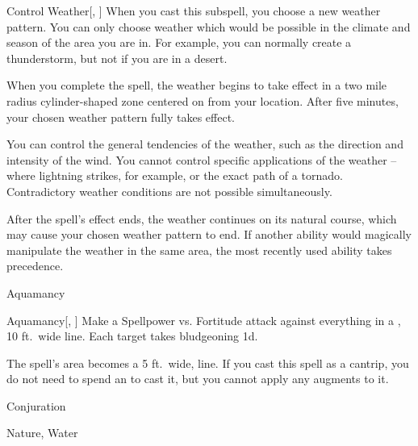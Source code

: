 \begin{ability}[\nth{7}]{Control Weather}[, ]
When you cast this subspell, you choose a new weather pattern.
You can only choose weather which would be possible in the climate and season of the area you are in.
For example, you can normally create a thunderstorm, but not if you are in a desert.

When you complete the spell, the weather begins to take effect in a two mile radius cylinder-shaped zone centered on from your location.
After five minutes, your chosen weather pattern fully takes effect.

You can control the general tendencies of the weather, such as the direction and intensity of the wind.
You cannot control specific applications of the weather -- where lightning strikes, for example, or the exact path of a tornado.
Contradictory weather conditions are not possible simultaneously.

After the spell's effect ends, the weather continues on its natural course, which may cause your chosen weather pattern to end.
If another ability would magically manipulate the weather in the same area, the most recently used ability takes precedence.
\end{ability}
\vspace{0.25em}

\newpage
\begin{spellsection}{Aquamancy}

\begin{spellheader}
\end{spellheader}


\begin{ability}{Aquamancy}[, ]
Make a Spellpower vs. Fortitude attack against everything in a \arealarge, 10 ft.\ wide line.
\hit Each target takes bludgeoning  \minus1d.
\end{ability}



 The spell's area becomes a 5 ft.\ wide, \areamed line. If you cast this spell as a cantrip,
you do not need to spend an  to cast it,
but you cannot apply any augments to it.


 Conjuration

 Nature, Water
\end{spellsection}



